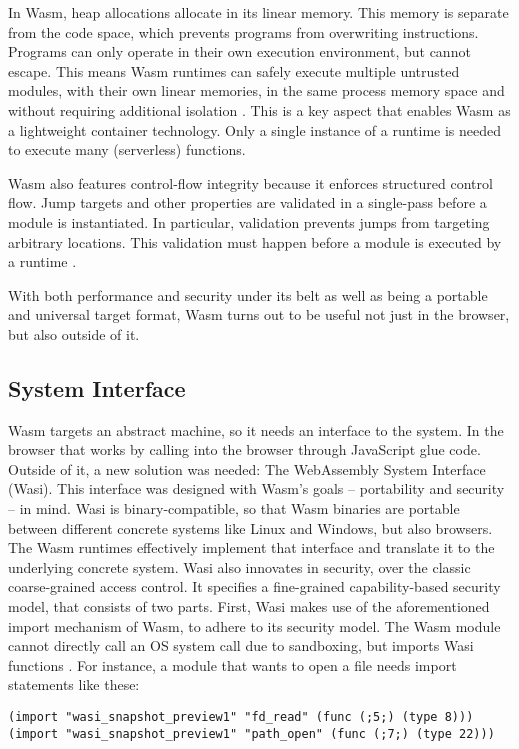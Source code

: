 In Wasm, heap allocations allocate in its linear memory. This memory is separate from the code space, which prevents programs from overwriting instructions. Programs can only operate in their own execution environment, but cannot escape. This means Wasm runtimes can safely execute multiple untrusted modules, with their own linear memories, in the same process memory space and without requiring additional isolation \cite{Haas2017}. This is a key aspect that enables Wasm as a lightweight container technology. Only a single instance of a runtime is needed to execute many (serverless) functions.

Wasm also features control-flow integrity because it enforces structured control flow. Jump targets and other properties are validated in a single-pass before a module is instantiated. In particular, validation prevents jumps from targeting arbitrary locations. This validation must happen before a module is executed by a runtime \cite{Haas2017}.

With both performance and security under its belt as well as being a portable and universal target format, Wasm turns out to be useful not just in the browser, but also outside of it.

\subsection{System Interface}

Wasm targets an abstract machine, so it needs an interface to the system. In the browser that works by calling into the browser through JavaScript glue code. Outside of it, a new solution was needed: The WebAssembly System Interface (Wasi). This interface was designed with Wasm's goals -- portability and security -- in mind.
Wasi is binary-compatible, so that Wasm binaries are portable between different concrete systems like Linux and Windows, but also browsers. The Wasm runtimes effectively implement that interface and translate it to the underlying concrete system.
Wasi also innovates in security, over the classic coarse-grained access control. It specifies a fine-grained capability-based security model, that consists of two parts. First, Wasi makes use of the aforementioned import mechanism of Wasm, to adhere to its security model. The Wasm module cannot directly call an OS system call due to sandboxing, but imports Wasi functions \cite{Clark2019}. For instance, a module that wants to open a file needs import statements like these:

\begin{verbatim}
(import "wasi_snapshot_preview1" "fd_read" (func (;5;) (type 8)))
(import "wasi_snapshot_preview1" "path_open" (func (;7;) (type 22)))
\end{verbatim}

